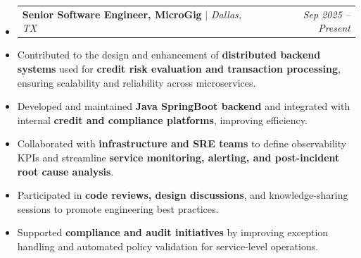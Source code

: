 \documentclass[a4paper,10pt]{article}
\makeatletter
\newcommand{\resumeSubheading}[4]{
  \vspace{-1pt}\item
    \begin{tabular*}{\linewidth}{l@{\extracolsep{\fill}}r}
      \textbf{#1} $|$ \textit{#2} & \textit{#4} \\
    \end{tabular*}\vspace{-4pt}
}
\newcommand{\textbulletlight}{\raisebox{0.15ex}{\scalebox{0.6}{$\bullet$}}}
\makeatother
\begin{document}
\begin{itemize}[leftmargin=0pt, rightmargin=0pt, label={}, itemsep=0pt]
    \resumeSubheading{Senior Software Engineer, MicroGig}{Dallas, TX}
    {}{Sep 2025 -- Present}
\end{itemize}\vspace{-6pt}
\begin{itemize}[leftmargin=12pt, rightmargin=0pt, label={\textbulletlight}, itemsep=0pt, topsep=2pt]
        \item \small Contributed to the design and enhancement of \textbf{distributed backend systems} used for \textbf{credit risk evaluation and transaction processing}, ensuring scalability and reliability across microservices.
        \item Developed and maintained \textbf{Java SpringBoot backend} and integrated with internal \textbf{credit and compliance platforms}, improving efficiency.
        \item Collaborated with \textbf{infrastructure and SRE teams} to define observability KPIs and streamline \textbf{service monitoring, alerting, and post-incident root cause analysis}.
        \item Participated in \textbf{code reviews, design discussions}, and knowledge-sharing sessions to promote engineering best practices.
        \item Supported \textbf{compliance and audit initiatives} by improving exception handling and automated policy validation for service-level operations.
\end{itemize}
\end{document}
